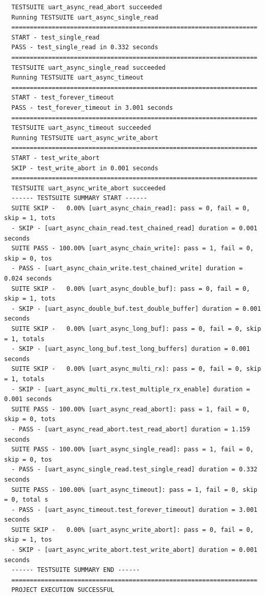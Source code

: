 \documentclass[11pt,a4paper,oneside]{article}
\begin{document}
\begin{lstlisting}
  TESTSUITE uart_async_read_abort succeeded
  Running TESTSUITE uart_async_single_read
  ===================================================================
  START - test_single_read
  PASS - test_single_read in 0.332 seconds
  ===================================================================
  TESTSUITE uart_async_single_read succeeded
  Running TESTSUITE uart_async_timeout
  ===================================================================
  START - test_forever_timeout
  PASS - test_forever_timeout in 3.001 seconds
  ===================================================================
  TESTSUITE uart_async_timeout succeeded
  Running TESTSUITE uart_async_write_abort
  ===================================================================
  START - test_write_abort
  SKIP - test_write_abort in 0.001 seconds
  ===================================================================
  TESTSUITE uart_async_write_abort succeeded
  ------ TESTSUITE SUMMARY START ------
  SUITE SKIP -   0.00% [uart_async_chain_read]: pass = 0, fail = 0, skip = 1, tots
  - SKIP - [uart_async_chain_read.test_chained_read] duration = 0.001 seconds
  SUITE PASS - 100.00% [uart_async_chain_write]: pass = 1, fail = 0, skip = 0, tos
  - PASS - [uart_async_chain_write.test_chained_write] duration = 0.024 seconds
  SUITE SKIP -   0.00% [uart_async_double_buf]: pass = 0, fail = 0, skip = 1, tots
  - SKIP - [uart_async_double_buf.test_double_buffer] duration = 0.001 seconds
  SUITE SKIP -   0.00% [uart_async_long_buf]: pass = 0, fail = 0, skip = 1, totals
  - SKIP - [uart_async_long_buf.test_long_buffers] duration = 0.001 seconds
  SUITE SKIP -   0.00% [uart_async_multi_rx]: pass = 0, fail = 0, skip = 1, totals
  - SKIP - [uart_async_multi_rx.test_multiple_rx_enable] duration = 0.001 seconds
  SUITE PASS - 100.00% [uart_async_read_abort]: pass = 1, fail = 0, skip = 0, tots
  - PASS - [uart_async_read_abort.test_read_abort] duration = 1.159 seconds
  SUITE PASS - 100.00% [uart_async_single_read]: pass = 1, fail = 0, skip = 0, tos
  - PASS - [uart_async_single_read.test_single_read] duration = 0.332 seconds
  SUITE PASS - 100.00% [uart_async_timeout]: pass = 1, fail = 0, skip = 0, total s
  - PASS - [uart_async_timeout.test_forever_timeout] duration = 3.001 seconds
  SUITE SKIP -   0.00% [uart_async_write_abort]: pass = 0, fail = 0, skip = 1, tos
  - SKIP - [uart_async_write_abort.test_write_abort] duration = 0.001 seconds
  ------ TESTSUITE SUMMARY END ------
  ===================================================================
  PROJECT EXECUTION SUCCESSFUL
\end{lstlisting}
\end{document}
